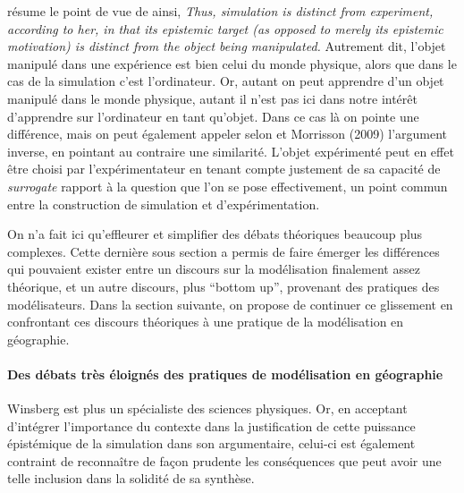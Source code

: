 \textcite{Winsberg2013} résume le point de vue de \autocite{Peschard2010} ainsi, \textit{Thus, simulation is distinct from experiment, according to her, in that its epistemic target (as opposed to merely its epistemic motivation) is distinct from the object being manipulated.} Autrement dit, l'objet manipulé dans une expérience est bien celui du monde physique, alors que dans le cas de la simulation c'est l'ordinateur. Or, autant on peut apprendre d'un objet manipulé dans le monde physique, autant il n'est pas ici dans notre intérêt d'apprendre sur l'ordinateur en tant qu'objet. Dans ce cas là on pointe une différence, mais on peut également appeler selon \textcite{Winsberg2013} et Morrisson (2009) l'argument inverse, en pointant au contraire une similarité. L'objet expérimenté peut en effet être choisi par l'expérimentateur en tenant compte justement de sa capacité de \textit{surrogate} rapport à la question que l'on se pose effectivement, un point commun entre la construction de simulation et d'expérimentation.

On n'a fait ici qu'effleurer et simplifier des débats théoriques beaucoup plus complexes. Cette dernière sous section a permis de faire émerger les différences qui pouvaient exister entre un discours sur la modélisation finalement assez théorique, et un autre discours, plus \foreignquote{english}{bottom up}, provenant des pratiques des modélisateurs. Dans la section suivante, on propose de continuer ce glissement en confrontant ces discours théoriques à une pratique de la modélisation en géographie.

\paragraph{Des débats très éloignés des pratiques de modélisation en géographie}

Winsberg est plus un spécialiste des sciences physiques. Or, en acceptant d'intégrer l'importance du contexte dans la justification de cette puissance épistémique de la simulation dans son argumentaire, celui-ci est également contraint de reconnaître de façon prudente les conséquences que peut avoir une telle inclusion dans la solidité de sa synthèse.

